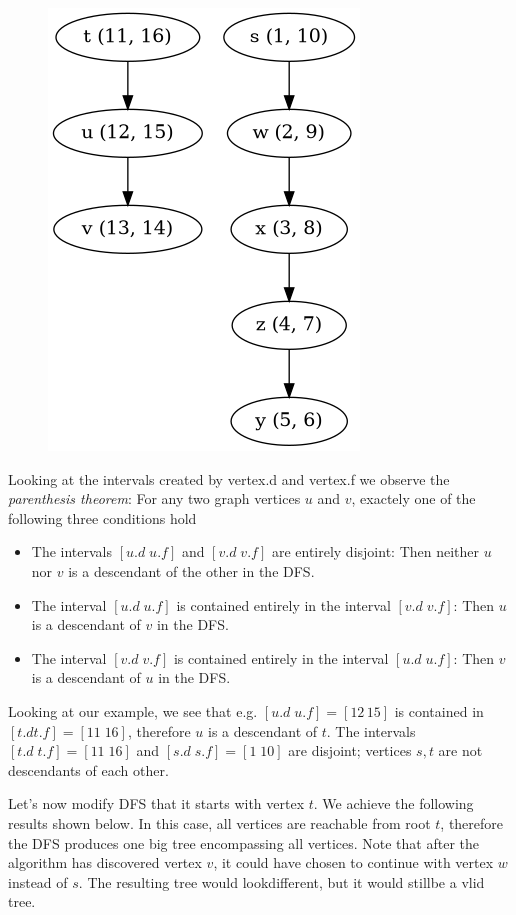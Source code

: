 \begin{figure}[H]
\centering
\includegraphics[scale=0.4]{images/dfs_02.png}
\end{figure}

Looking at the intervals created by vertex.d and vertex.f we observe the \emph{parenthesis theorem}: For any two graph vertices $u$ and $v$, exactely one of the following three conditions hold

\begin{itemize}
\item The intervals $[u.d\; u.f]$ and $[v.d\; v.f]$ are entirely disjoint: Then neither $u$ nor $v$ is a descendant of the other in the DFS.
\item The interval $[u.d\; u.f]$ is contained entirely in the interval $[v.d\; v.f]$: Then $u$ is a descendant of $v$ in the DFS.
\item The interval $[v.d\; v.f]$ is contained entirely in the interval $[u.d\; u.f]$: Then $v$ is a descendant of $u$ in the DFS.
\end{itemize}

Looking at our example, we see that e.g. $[u.d\;u.f] = [12\, 15]$ is contained in $[t.d t.f] = [11\; 16]$, therefore $u$ is a descendant of $t$. The intervals $[t.d\; t.f] = [11\; 16]$ and $[s.d\; s.f] = [1\; 10]$ are disjoint; vertices $s, t$ are not descendants of each other.


Let's now modify DFS that it starts with vertex $t$. We achieve the following results shown below. In this case, all vertices are reachable from root $t$, therefore the DFS produces one big tree encompassing all vertices. Note that after the algorithm has discovered vertex $v$, it could have chosen to continue with vertex $w$ instead of $s$. The resulting tree would lookdifferent, but it would stillbe a vlid tree.

